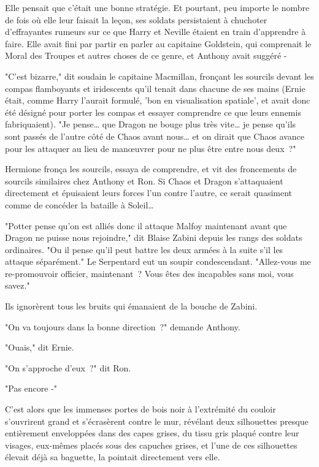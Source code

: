 Elle pensait que c'était une bonne stratégie. Et pourtant, peu importe le nombre de fois où elle leur faisait la leçon, ses soldats persistaient à chuchoter d'effrayantes rumeurs sur ce que Harry et Neville étaient en train d'apprendre à faire. Elle avait fini par partir en parler au capitaine Goldstein, qui comprenait le Moral des Troupes et autres choses de ce genre, et Anthony avait suggéré -

"C'est bizarre," dit soudain le capitaine Macmillan, fronçant les sourcils devant les compas flamboyants et iridescents qu'il tenait dans chacune de ses mains (Ernie était, comme Harry l'aurait formulé, 'bon en visualisation spatiale', et avait donc été désigné pour porter les compas et essayer comprendre ce que leurs ennemis fabriquaient). "Je pense… que Dragon ne bouge plus très vite… je pense qu'ils sont passés de l'autre côté de Chaos avant nous… et on dirait que Chaos avance pour les attaquer au lieu de manœuvrer pour ne plus être entre nous deux~?"

Hermione fronça les sourcils, essaya de comprendre, et vit des froncements de sourcils similaires chez Anthony et Ron. Si Chaos et Dragon s'attaquaient directement et épuisaient leurs forces l'un contre l'autre, ce serait quasiment comme de concéder la bataille à Soleil…

"Potter pense qu'on est alliés donc il attaque Malfoy maintenant avant que Dragon ne puisse nous rejoindre," dit Blaise Zabini depuis les rangs des soldats ordinaires. "Ou il pense qu'il peut battre les deux armées à la suite s'il les attaque séparément." Le Serpentard eut un soupir condescendant. "Allez-vous me re-promouvoir officier, maintenant~? Vous êtes des incapables sans moi, vous savez."

Ils ignorèrent tous les bruits qui émanaient de la bouche de Zabini.

"On va toujours dans la bonne direction~?" demande Anthony.

"Ouais," dit Ernie.

"On s'approche d'eux~?" dit Ron.

"Pas encore -"

C'est alors que les immenses portes de bois noir à l'extrémité du couloir s'ouvrirent grand et s'écrasèrent contre le mur, révélant deux silhouettes presque entièrement enveloppées dans des capes grises, du tissu gris plaqué contre leur visages, eux-mêmes placés sous des capuches grises, et l'une de ces silhouettes élevait déjà sa baguette, la pointait directement vers elle.

